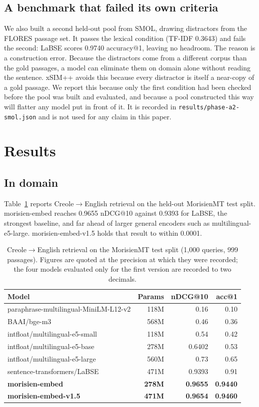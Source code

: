 \documentclass[11pt]{article}
\begin{document}
\subsection{A benchmark that failed its own criteria}
\label{sec:smol}

We also built a second held-out pool from SMOL, drawing distractors from the FLORES passage set. It
passes the lexical condition (TF-IDF 0.3643) and fails the second: LaBSE scores 0.9740 accuracy@1,
leaving no headroom. The reason is a construction error. Because the distractors come from a
different corpus than the gold passages, a model can eliminate them on domain alone without reading
the sentence. xSIM++ avoids this because every distractor is itself a near-copy of a gold passage. We
report this because only the first condition had been checked before the pool was built and
evaluated, and because a pool constructed this way will flatter any model put in front of it. It is
recorded in \texttt{results/phase-a2-smol.json} and is not used for any claim in this paper.

\section{Results}

\subsection{In domain}
\label{sec:indomain}

Table~\ref{tab:retrieval} reports Creole$\rightarrow$English retrieval on the held-out MorisienMT
test split. morisien-embed reaches 0.9655 nDCG@10 against 0.9393 for LaBSE, the strongest baseline,
and far ahead of larger general encoders such as multilingual-e5-large. morisien-embed-v1.5 holds
that result to within 0.0001.

\begin{table}[h]
\centering
\small
\begin{tabular}{lrrr}
\toprule
Model & Params & nDCG@10 & acc@1 \\
\midrule
paraphrase-multilingual-MiniLM-L12-v2 & 118M & 0.16 & 0.10 \\
BAAI/bge-m3 & 568M & 0.46 & 0.36 \\
intfloat/multilingual-e5-small & 118M & 0.54 & 0.42 \\
intfloat/multilingual-e5-base & 278M & 0.6402 & 0.53 \\
intfloat/multilingual-e5-large & 560M & 0.73 & 0.65 \\
sentence-transformers/LaBSE & 471M & 0.9393 & 0.91 \\
\textbf{morisien-embed} & \textbf{278M} & \textbf{0.9655} & \textbf{0.9440} \\
\textbf{morisien-embed-v1.5} & \textbf{471M} & \textbf{0.9654} & \textbf{0.9460} \\
\bottomrule
\end{tabular}
\caption{Creole$\rightarrow$English retrieval on the MorisienMT test split (1{,}000 queries, 999
passages). Figures are quoted at the precision at which they were recorded; the four models evaluated
only for the first version are recorded to two decimals.}
\label{tab:retrieval}
\end{table}
\end{document}
